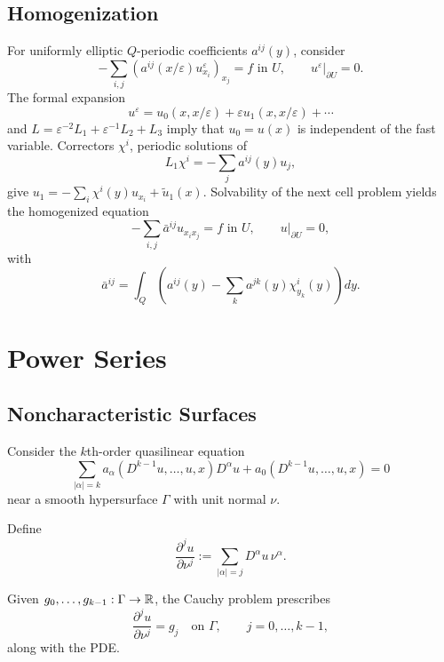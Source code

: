 \subsection{Homogenization}
\label{sec:homogenization}

\begin{example}
\label{ex:periodic-homogenization-elliptic}
For uniformly elliptic $Q$-periodic coefficients $a^{ij}(y)$, consider
\[
-\sum_{i,j}(a^{ij}(x/\varepsilon)u^\varepsilon_{x_i})_{x_j}=f\text{ in }U,
\qquad u^\varepsilon|_{\partial U}=0.
\]
The formal expansion
\[
u^\varepsilon=u_0(x,x/\varepsilon)+\varepsilon u_1(x,x/\varepsilon)+\cdots
\]
and $L=\varepsilon^{-2}L_1+\varepsilon^{-1}L_2+L_3$ imply that $u_0=u(x)$
is independent of the fast variable. Correctors $\chi^i$, periodic solutions
of
\[
L_1\chi^i=-\sum_j a^{ij}(y)u_j,
\]
give $u_1=-\sum_i\chi^i(y)u_{x_i}+\tilde u_1(x)$. Solvability of the next
cell problem yields the homogenized equation
\[
-\sum_{i,j}\bar a^{ij}u_{x_ix_j}=f\text{ in }U,\qquad u|_{\partial U}=0,
\]
with
\[
\bar a^{ij}=\int_Q\left(a^{ij}(y)-\sum_k a^{jk}(y)\chi^i_{y_k}(y)\right)dy.
\]
\end{example}

\section{Power Series}
\label{sec:power-series}

\subsection{Noncharacteristic Surfaces}
\label{sec:noncharacteristic-surfaces}

Consider the $k$th-order quasilinear equation
\[
\sum_{|\alpha|=k}a_\alpha(D^{k-1}u,\ldots,u,x)D^\alpha u+a_0(D^{k-1}u,\ldots,u,x)=0
\]
near a smooth hypersurface $\Gamma$ with unit normal $\nu$.

\begin{definition}
\label{def:normal-derivative-notation}
Define
\[
\frac{\partial^ju}{\partial\nu^j}:=
\sum_{|\alpha|=j}D^\alpha u\,\nu^\alpha.
\]
\end{definition}

\begin{definition}
\label{def:cauchy-problem-cauchy-data}

Given $g_0,\ldots,g_{k-1}:\Gamma\to\mathbb{R}$, the Cauchy problem prescribes
\[
\frac{\partial^ju}{\partial\nu^j}=g_j\quad\text{on }\Gamma,
\qquad j=0,\ldots,k-1,
\]
along with the PDE.
\end{definition}


